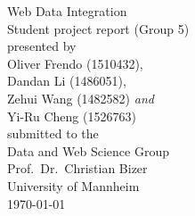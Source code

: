 \documentclass[11pt,titlepage,oneside,openany]{article}
\begin{document}
\begin{titlepage}
	\vspace*{2cm}
  \begin{center}
   {\Large Web Data Integration\\}
   \vspace{2cm} 
   {Student project report (Group 5)\\}
   \vspace{2cm}
   {presented by\\
    Oliver Frendo (1510432), \\
    Dandan Li (1486051),\\
    Zehui Wang (1482582) \textit{and} \\
	Yi-Ru Cheng (1526763) \\
   }
   \vspace{1cm} 
   {submitted to the\\
    Data and Web Science Group\\
    Prof.\ Dr.\ Christian Bizer\\
    University of Mannheim\\} \vspace{2cm}
   {\today}
  \end{center}
\end{titlepage} 

\tableofcontents
\newpage


\listoffigures

\listoftables


\newpage








%
%






\end{document}
